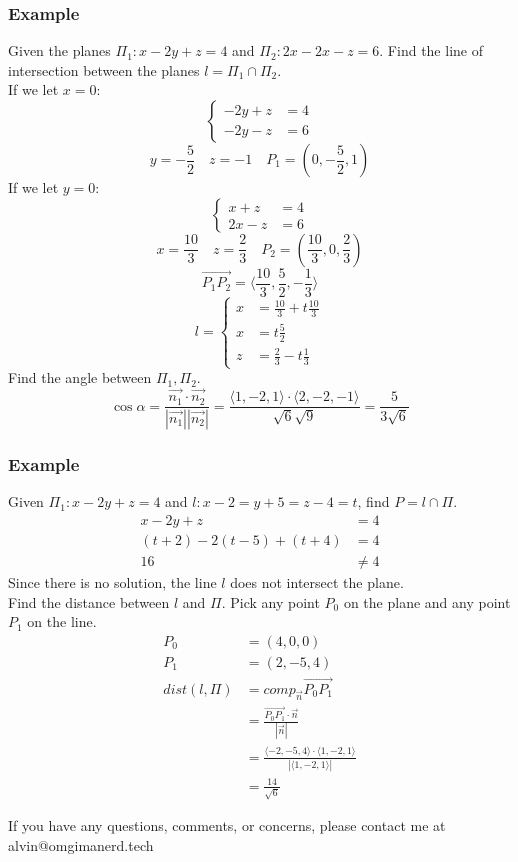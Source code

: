 \documentclass[letterpaper, 12pt]{math}
\begin{document}
\subsubsection*{Example}
Given the planes \( \Pi_1: x-2y+z = 4 \) and \( \Pi_2: 2x-2x-z = 6 \). Find the
line of intersection between the planes \( l = \Pi_1\cap\Pi_2 \). \\
If we let \( x = 0 \):
\[ \begin{cases}
  -2y+z &= 4 \\
  -2y-z &= 6
\end{cases} \]
\[ y = -\frac{5}{2} \quad z = -1 \quad P_1 = (0,-\frac{5}{2},1) \]
If we let \( y = 0 \):
\[ \begin{cases}
  x+z &= 4 \\
  2x-z &= 6
\end{cases} \]
\[ x = \frac{10}{3} \quad z = \frac{2}{3} \quad P_2 =
  (\frac{10}{3},0,\frac{2}{3}) \]
\[ \overrightarrow{P_1P_2} =
  \langle\frac{10}{3},\frac{5}{2},-\frac{1}{3}\rangle \]
\[ l = \begin{cases}
  x &= \frac{10}{3}+t\frac{10}{3} \\
  x &= t\frac{5}{2} \\
  z &= \frac{2}{3}-t\frac{1}{3}
\end{cases} \]
Find the angle between \( \Pi_1,\Pi_2 \).
\[ \cos\alpha = \frac{\vec{n_1}\cdot\vec{n_2}}{|\vec{n_1}||\vec{n_2}|} =
  \frac{\langle1,-2,1\rangle\cdot\langle2,-2,-1\rangle}{\sqrt{6}\sqrt{9}} =
  \frac{5}{3\sqrt{6}} \]

\subsubsection*{Example}
Given \( \Pi_1: x-2y+z = 4 \) and \( l: x-2 = y+5 = z-4 = t \), find
\( P = l\cap\Pi \).
\begin{align*}
  x-2y+z &= 4 \\
  (t+2)-2(t-5)+(t+4) &= 4 \\
  16 &\ne 4
\end{align*}
Since there is no solution, the line \( l \) does not intersect the plane. \\
Find the distance between \( l \) and \( \Pi \). Pick any point \( P_0 \) on
the plane and any point \( P_1 \) on the line.
\begin{align*}
  P_0 &= (4,0,0) \\
  P_1 &= (2,-5,4) \\
  dist(l,\Pi) &= comp_{\vec{n}}{\overrightarrow{P_0P_1}} \\
  &= \frac{\overrightarrow{P_0P_1}\cdot\vec{n}}{|\vec{n}|} \\
  &= \frac{\langle-2,-5,4\rangle\cdot\langle1,-2,1\rangle}
    {|\langle1,-2,1\rangle|} \\
  &= \frac{14}{\sqrt{6}}
\end{align*}

\begin{center}
  If you have any questions, comments, or concerns, please contact me at
  alvin@omgimanerd.tech
\end{center}
\end{document}
